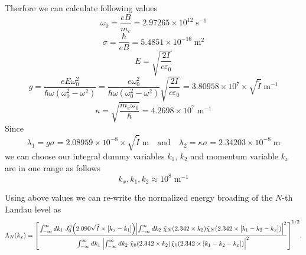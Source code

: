 \noindent
Therfore we can calculate following values
\begin{equation} \label{5.17}
  \omega_0 = \frac{eB}{m_e} = 2.97265 \times 10^{12}\; \text{s}^{-1}
\end{equation}
\begin{equation} \label{5.18}
  \sigma = \frac{\hbar}{eB} = 5.4851 \times 10^{-16}\; \text{m}^{2}
\end{equation}
\begin{equation} \label{5.19}
  E = \sqrt{\frac{2I}{c\varepsilon_0}}
\end{equation}
\begin{equation} \label{5.20}
  g = \frac{eE\omega_0^2}{\hbar\omega(\omega_0^2 - \omega^2)}
  = \frac{e\omega_0^2}{\hbar\omega(\omega_0^2 - \omega^2)}  \sqrt{\frac{2I}{c\varepsilon_0}}
  = 3.80958 \times 10^{7}\times \sqrt{\tilde{I}}\; \text{m}^{-1}
\end{equation}
\begin{equation} \label{5.21}
  \kappa = \sqrt{\frac{m_e \omega_0}{\hbar}}
  = 4.2698 \times 10^{7}\; \text{m}^{-1}
\end{equation}
Since
\begin{equation} \label{5.22}
  \lambda_1 = g\sigma
  = 2.08959 \times 10^{-8} \times \sqrt{\tilde{I}}\; \text{m} \quad \text{and} \quad
  \lambda_2 = \kappa\sigma = 2.34203 \times 10^{-8}\; \text{m}
\end{equation}
we can choose our integral dummy variables $k_1$, $k_2$ and momentum variable $k_x$ are in one range as follows
\begin{equation} \label{5.23}
  k_x,k_1,k_2 \approx 10^{8}\; \text{m}^{-1}
\end{equation}

\noindent
Using above values we can re-write the normalized energy broading of the $N$-th Landau level as
\begin{equation} \label{5.24}
    \Lambda_N (k_x) =
    \qty[
    \frac
    {\int_{-\infty}^{\infty} d {k}_1 \;
    J_0^2\qty(2.090\sqrt{\tilde{I}}\times[{k}_x - {k}_1])
    \qty|
    \int_{-\infty}^{\infty} d{k}_2 \;
    \tilde{\chi}_{N}\qty(2.342 \times k_2)
    \tilde{\chi}_{N}\qty(2.342 \times \qty[{k}_1 - {k}_2 - {k}_x])|^2}
    {\int_{-\infty}^{\infty} d {k}_1 \;
    \qty|
    \int_{-\infty}^{\infty} d{k}_2 \;
    \tilde{\chi}_{0}\qty(2.342 \times k_2)
    \tilde{\chi}_{0}\qty(2.342 \times \qty[{k}_1 - {k}_2 - {k}_x])|^2}
    ]^{1/2}.
\end{equation}

